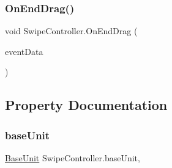 \subsubsection{\texorpdfstring{OnEndDrag()}{OnEndDrag()}}
{\footnotesize\ttfamily void Swipe\+Controller.\+On\+End\+Drag (\begin{DoxyParamCaption}\item[{Pointer\+Event\+Data}]{event\+Data }\end{DoxyParamCaption})}



\subsection{Property Documentation}
\mbox{\label{class_swipe_controller_a422f7e579179be4a1e6e198d97068cc2}} 
\subsubsection{\texorpdfstring{baseUnit}{baseUnit}}
{\footnotesize\ttfamily \mbox{\hyperlink{class_base_unit}{Base\+Unit}} Swipe\+Controller.\+base\+Unit\hspace{0.3cm}{\ttfamily [get]}, {\ttfamily [set]}}

